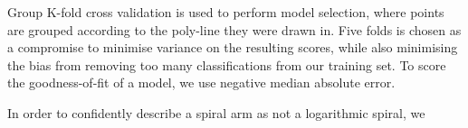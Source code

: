 \documentclass[../main.tex]{subfiles}
\begin{document}

Group K-fold cross validation is used to perform model selection, where points are grouped according to the poly-line they were drawn in. Five folds is chosen as a compromise to minimise variance on the resulting scores, while also minimising the bias from removing too many classifications from our training set. To score the goodness-of-fit of a model, we use negative median absolute error.


In order to confidently describe a spiral arm as not a logarithmic spiral, we 
\end{document}
